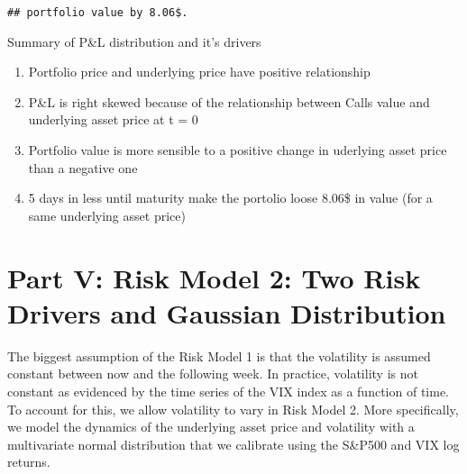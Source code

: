 \documentclass[]{article}
\providecommand{\tightlist}{%
  \setlength{\itemsep}{0pt}\setlength{\parskip}{0pt}}
\begin{document}
\begin{verbatim}
## portfolio value by 8.06$.
\end{verbatim}

Summary of P\&L distribution and it's drivers

\begin{enumerate}
\def\labelenumi{\arabic{enumi}.}
\tightlist
\item
  Portfolio price and underlying price have positive relationship
\item
  P\&L is right skewed because of the relationship between Calls value
  and underlying asset price at t = 0
\item
  Portfolio value is more sensible to a positive change in uderlying
  asset price than a negative one
\item
  5 days in less until maturity make the portolio loose 8.06\$ in value
  (for a same underlying asset price)
\end{enumerate}

\hypertarget{part-v-risk-model-2-two-risk-drivers-and-gaussian-distribution}{%
\section{Part V: Risk Model 2: Two Risk Drivers and Gaussian
Distribution}\label{part-v-risk-model-2-two-risk-drivers-and-gaussian-distribution}}

The biggest assumption of the Risk Model 1 is that the volatility is
assumed constant between now and the following week. In practice,
volatility is not constant as evidenced by the time series of the VIX
index as a function of time. To account for this, we allow volatility to
vary in Risk Model 2. More specifically, we model the dynamics of the
underlying asset price and volatility with a multivariate normal
distribution that we calibrate using the S\&P500 and VIX log returns.
\end{document}

